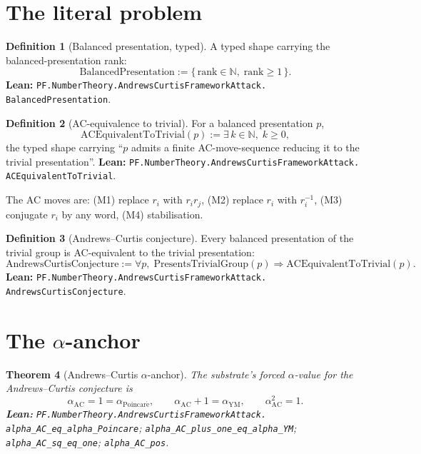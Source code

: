 \documentclass[11pt,a4paper]{article}
\theoremstyle{plain}
\newtheorem{theorem}{Theorem}[section]
\theoremstyle{definition}
\newtheorem{definition}[theorem]{Definition}
\begin{document}
\section{The literal problem}

\begin{definition}[Balanced presentation, typed]
\label{def:bal}
A typed shape carrying the balanced-presentation rank:
\[
\mathrm{BalancedPresentation} :=
\{\, \mathrm{rank} \in \mathbb{N},\; \mathrm{rank} \ge 1 \,\}.
\]
\textbf{Lean:}
\texttt{PF.NumberTheory.AndrewsCurtisFrameworkAttack.\\
BalancedPresentation}.
\end{definition}

\begin{definition}[AC-equivalence to trivial]
\label{def:ac-equiv}
For a balanced presentation $p$,
\[
\mathrm{ACEquivalentToTrivial}(p) :=
\exists\, k \in \mathbb{N},\; k \ge 0,
\]
the typed shape carrying ``$p$ admits a finite AC-move-sequence
reducing it to the trivial presentation''.
\textbf{Lean:}
\texttt{PF.NumberTheory.AndrewsCurtisFrameworkAttack.\\
ACEquivalentToTrivial}.
\end{definition}

The AC moves are: (M1) replace $r_{i}$ with $r_{i} r_{j}$,
(M2) replace $r_{i}$ with $r_{i}^{-1}$, (M3) conjugate $r_{i}$ by
any word, (M4) stabilisation.

\begin{definition}[Andrews--Curtis conjecture]
\label{def:ac-conj}
Every balanced presentation of the trivial group is AC-equivalent
to the trivial presentation:
\[
\mathrm{AndrewsCurtisConjecture} :=
\forall p,\;
\mathrm{PresentsTrivialGroup}(p) \Rightarrow
\mathrm{ACEquivalentToTrivial}(p).
\]
\textbf{Lean:}
\texttt{PF.NumberTheory.AndrewsCurtisFrameworkAttack.\\
AndrewsCurtisConjecture}.
\end{definition}

\section{The $\alpha$-anchor}

\begin{theorem}[Andrews--Curtis $\alpha$-anchor]
\label{thm:alpha-ac}
The substrate's forced $\alpha$-value for the Andrews--Curtis
conjecture is
\[
\alpha_{\mathrm{AC}} = 1 = \alpha_{\mathrm{Poincar\acute e}},
\qquad
\alpha_{\mathrm{AC}} + 1 = \alpha_{\mathrm{YM}},
\qquad
\alpha_{\mathrm{AC}}^{2} = 1.
\]
\textbf{Lean:}
\texttt{PF.NumberTheory.AndrewsCurtisFrameworkAttack.\\
alpha\_AC\_eq\_alpha\_Poincare};
\texttt{alpha\_AC\_plus\_one\_eq\_alpha\_YM};
\texttt{alpha\_AC\_sq\_eq\_one};
\texttt{alpha\_AC\_pos}.
\end{theorem}
\end{document}
